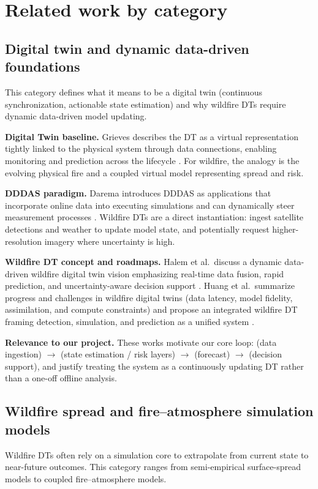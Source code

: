 \documentclass[acmsmall,screen,nonacm]{acmart}
\begin{document}
\section{Related work by category}

\subsection{Digital twin and dynamic data-driven foundations}
This category defines what it means to be a digital twin (continuous synchronization, actionable state
estimation) and why wildfire DTs require dynamic data-driven model updating.

\textbf{Digital Twin baseline.} Grieves describes the DT as a virtual representation tightly linked to the
physical system through data connections, enabling monitoring and prediction across the lifecycle
\cite{grieves2014digitaltwin}. For wildfire, the analogy is the evolving physical fire and a coupled virtual model
representing spread and risk.

\textbf{DDDAS paradigm.} Darema introduces DDDAS as applications that incorporate online data into executing
simulations and can dynamically steer measurement processes \cite{darema2004dddas}. Wildfire DTs are a direct
instantiation: ingest satellite detections and weather to update model state, and potentially request
higher-resolution imagery where uncertainty is high.

\textbf{Wildfire DT concept and roadmaps.} Halem et al.\ discuss a dynamic data-driven wildfire digital twin vision
emphasizing real-time data fusion, rapid prediction, and uncertainty-aware decision support \cite{halem2024wdt}.
Huang et al.\ summarize progress and challenges in wildfire digital twins (data latency, model fidelity,
assimilation, and compute constraints) and propose an integrated wildfire DT framing detection, simulation, and
prediction as a unified system \cite{huang2024wdtprogress}.

\textbf{Relevance to our project.} These works motivate our core loop:
(data ingestion) $\rightarrow$ (state estimation / risk layers) $\rightarrow$ (forecast) $\rightarrow$ (decision support),
and justify treating the system as a continuously updating DT rather than a one-off offline analysis.

\subsection{Wildfire spread and fire--atmosphere simulation models}
Wildfire DTs often rely on a simulation core to extrapolate from current state to near-future outcomes. This
category ranges from semi-empirical surface-spread models to coupled fire--atmosphere models.
\end{document}
